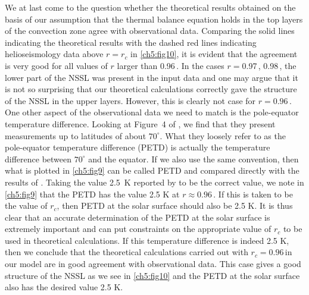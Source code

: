 We at last come to the question whether the theoretical results obtained on the basis of our assumption that the thermal balance equation holds in the top layers of the convection zone agree with observational data.  Comparing the solid lines indicating the theoretical results with the dashed red lines indicating helioseismology data above $r = r_c$ in \autoref{ch5:fig10}, it is evident that the agreement is very good for all values of $r$ larger than 0.96\,\Rsun. In the cases $r = $0.97\,\Rsun, 0.98\,\Rsun, the lower part of the NSSL was present in the input data and one may argue that it is not so surprising that our theoretical calculations correctly gave the structure of the NSSL in the upper layers.  However, this is clearly not case for $r = 0.96$\,\Rsun. One other aspect of the observational data we need to match is the pole-equator temperature difference. Looking at Figure~4 of \citet{Rast2008}, we find that they present measurements
up to latitudes of about $70^{\circ}$.  What they loosely
refer to as the pole-equator temperature difference (PETD)
is actually the temperature difference between $70^{\circ}$ and the equator.  If we also use the same convention,
then what is plotted in \autoref{ch5:fig9}
can be called PETD and compared directly with the results
of \citet{Rast2008}. Taking the value 2.5~K reported by \citet{Rast2008} to be the correct value, we note in \autoref{ch5:fig9} that the PETD has the value 2.5 K at $r \approx 0.96$\,\Rsun.  If this is taken to be the value of $r_c$, then PETD at the solar surface should also be 2.5 K. It is thus clear that an accurate determination of the PETD at the solar surface is extremely important and can put constraints on the appropriate value of $r_c$ to be used in theoretical calculations.  If this temperature difference is indeed 2.5 K, then we conclude that the theoretical calculations carried out with $r_c=0.96$\,\Rsun in our model are in good agreement with observational data.  This case gives a good structure of the NSSL as we see in \autoref{ch5:fig10} and the PETD at the solar surface also has the desired value 2.5 K.

